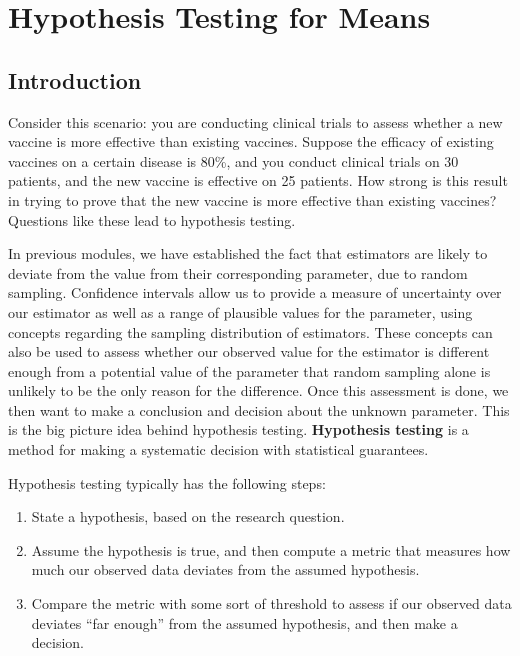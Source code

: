 \documentclass[
]{book}
\providecommand{\tightlist}{%
  \setlength{\itemsep}{0pt}\setlength{\parskip}{0pt}}
\theoremstyle{definition}
\theoremstyle{definition}
\theoremstyle{definition}
\theoremstyle{definition}
\theoremstyle{remark}
\begin{document}
\hypertarget{hyp}{%
\chapter{Hypothesis Testing for Means}\label{hyp}}

\hypertarget{introduction-4}{%
\section{Introduction}\label{introduction-4}}

Consider this scenario: you are conducting clinical trials to assess whether a new vaccine is more effective than existing vaccines. Suppose the efficacy of existing vaccines on a certain disease is 80\%, and you conduct clinical trials on 30 patients, and the new vaccine is effective on 25 patients. How strong is this result in trying to prove that the new vaccine is more effective than existing vaccines? Questions like these lead to hypothesis testing.

In previous modules, we have established the fact that estimators are likely to deviate from the value from their corresponding parameter, due to random sampling. Confidence intervals allow us to provide a measure of uncertainty over our estimator as well as a range of plausible values for the parameter, using concepts regarding the sampling distribution of estimators. These concepts can also be used to assess whether our observed value for the estimator is different enough from a potential value of the parameter that random sampling alone is unlikely to be the only reason for the difference. Once this assessment is done, we then want to make a conclusion and decision about the unknown parameter. This is the big picture idea behind hypothesis testing. \textbf{Hypothesis testing} is a method for making a systematic decision with statistical guarantees.

Hypothesis testing typically has the following steps:

\begin{enumerate}
\def\labelenumi{\arabic{enumi}.}
\tightlist
\item
  State a hypothesis, based on the research question.
\item
  Assume the hypothesis is true, and then compute a metric that measures how much our observed data deviates from the assumed hypothesis.
\item
  Compare the metric with some sort of threshold to assess if our observed data deviates ``far enough'' from the assumed hypothesis, and then make a decision.
\end{enumerate}
\end{document}
